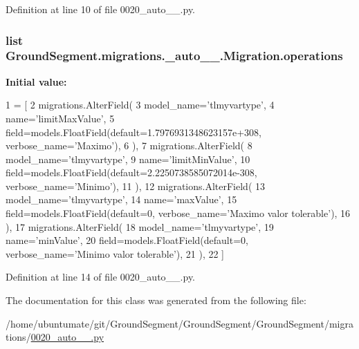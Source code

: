 Definition at line 10 of file 0020\+\_\+auto\+\_\+\_.\+py.

\hypertarget{class_ground_segment_1_1migrations_1_10020__auto__20161202__1040_1_1_migration_aaff1b2e3abd1729957533fd1b092344a}{}
\subsubsection[{operations}]{\setlength{\rightskip}{0pt plus 5cm}list Ground\+Segment.\+migrations.\+\_\+auto\+\_\+\_.\+Migration.\+operations\hspace{0.3cm}{\ttfamily [static]}}\label{class_ground_segment_1_1migrations_1_10020__auto__20161202__1040_1_1_migration_aaff1b2e3abd1729957533fd1b092344a}
{\bfseries Initial value\+:}
\begin{DoxyCode}
1 = [
2         migrations.AlterField(
3             model\_name=\textcolor{stringliteral}{'tlmyvartype'},
4             name=\textcolor{stringliteral}{'limitMaxValue'},
5             field=models.FloatField(default=1.7976931348623157e+308, verbose\_name=\textcolor{stringliteral}{'Maximo'}),
6         ),
7         migrations.AlterField(
8             model\_name=\textcolor{stringliteral}{'tlmyvartype'},
9             name=\textcolor{stringliteral}{'limitMinValue'},
10             field=models.FloatField(default=2.2250738585072014e-308, verbose\_name=\textcolor{stringliteral}{'Minimo'}),
11         ),
12         migrations.AlterField(
13             model\_name=\textcolor{stringliteral}{'tlmyvartype'},
14             name=\textcolor{stringliteral}{'maxValue'},
15             field=models.FloatField(default=0, verbose\_name=\textcolor{stringliteral}{'Maximo valor tolerable'}),
16         ),
17         migrations.AlterField(
18             model\_name=\textcolor{stringliteral}{'tlmyvartype'},
19             name=\textcolor{stringliteral}{'minValue'},
20             field=models.FloatField(default=0, verbose\_name=\textcolor{stringliteral}{'Minimo valor tolerable'}),
21         ),
22     ]
\end{DoxyCode}


Definition at line 14 of file 0020\+\_\+auto\+\_\+\_.\+py.



The documentation for this class was generated from the following file\+:\begin{DoxyCompactItemize}
\item 
/home/ubuntumate/git/\+Ground\+Segment/\+Ground\+Segment/\+Ground\+Segment/migrations/\hyperlink{0020__auto__20161202__1040_8py}{0020\+\_\+auto\+\_\+\_.\+py}\end{DoxyCompactItemize}
